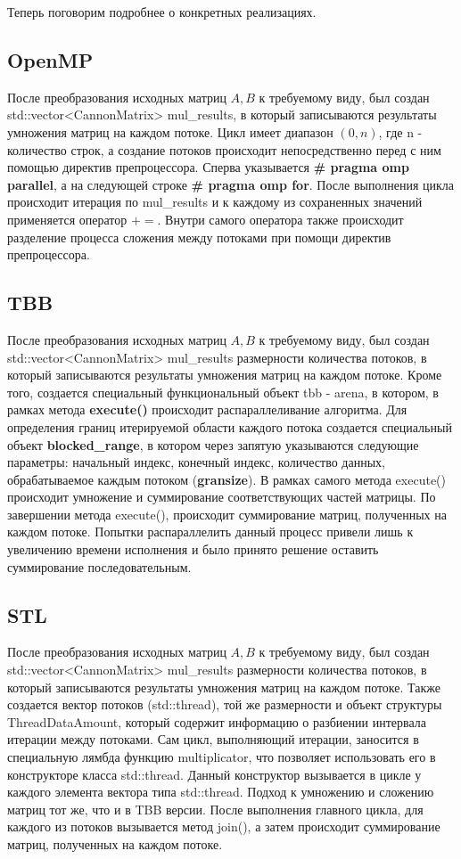 \documentclass[20pt]{article}
\begin{document}
Теперь поговорим подробнее о конкретных реализациях. \\
\subsection{OpenMP}
После преобразования исходных матриц $A, B$ к требуемому виду, был создан std::vector<CannonMatrix> mul\_results, в который записываются результаты умножения матриц на каждом потоке. Цикл имеет диапазон $(0, n)$, где n - количество строк, а создание потоков происходит непосредственно перед с ним помощью директив препроцессора. Сперва указывается \textbf{\# pragma omp parallel}, а на следующей строке \textbf{\# pragma omp for}. После выполнения цикла происходит итерация по mul\_results и к каждому из сохраненных значений применяется оператор $+=$. Внутри самого оператора также происходит разделение процесса сложения между потоками при помощи директив препроцессора. 
\newpage
\subsection{TBB}
После преобразования исходных матриц $A, B$ к требуемому виду, был создан std::vector<CannonMatrix> mul\_results размерности количества потоков, в который записываются результаты умножения матриц на каждом потоке. Кроме того, создается специальный функциональный объект tbb - arena, в котором, в рамках метода \textbf{execute()} происходит распараллеливание алгоритма. Для определения границ итерируемой области каждого потока создается специальный объект \textbf{blocked\_range}, в котором через запятую указываются следующие параметры: начальный индекс, конечный индекс, количество данных, обрабатываемое каждым потоком (\textbf{gransize}). В рамках самого метода execute() происходит умножение и суммирование соответствующих частей матрицы. По завершении метода execute(), происходит суммирование матриц, полученных на каждом потоке. Попытки распараллелить данный процесс привели лишь к увеличению времени исполнения и было принято решение оставить суммирование последовательным.  

\subsection{STL}
После преобразования исходных матриц $A, B$ к требуемому виду, был создан std::vector<CannonMatrix> mul\_results размерности количества потоков, в который записываются результаты умножения матриц на каждом потоке. Также создается вектор потоков (std::thread), той же размерности и объект структуры ThreadDataAmount, который содержит информацию о разбиении интервала итерации между потоками. Сам цикл, выполняющий итерации, заносится в специальную лямбда функцию multiplicator, что позволяет использовать его в конструкторе класса std::thread. Данный конструктор вызывается в цикле у каждого элемента вектора типа std::thread. Подход к умножению и сложению матриц тот же, что и в TBB версии. После выполнения главного цикла, для каждого из потоков вызывается метод join(), а затем происходит суммирование матриц, полученных на каждом потоке. 
\newpage
\end{document}
